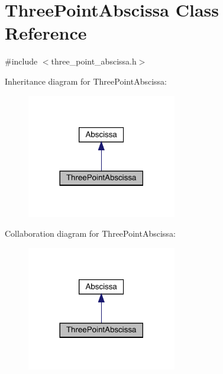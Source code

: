 \hypertarget{classThreePointAbscissa}{}\section{Three\+Point\+Abscissa Class Reference}
\label{classThreePointAbscissa}


{\ttfamily \#include $<$three\+\_\+point\+\_\+abscissa.\+h$>$}



Inheritance diagram for Three\+Point\+Abscissa\+:
\nopagebreak
\begin{figure}[H]
\begin{center}
\leavevmode
\includegraphics[width=185pt]{d2/d53/classThreePointAbscissa__inherit__graph}
\end{center}
\end{figure}


Collaboration diagram for Three\+Point\+Abscissa\+:
\nopagebreak
\begin{figure}[H]
\begin{center}
\leavevmode
\includegraphics[width=185pt]{d7/d9b/classThreePointAbscissa__coll__graph}
\end{center}
\end{figure}
